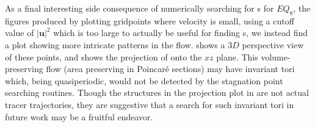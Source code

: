 \documentclass[letter,12pt,openany]{article}
\begin{document}
As a final interesting side consequence of
numerically searching for \stagp s for $EQ_8$, the figures produced by
plotting gridpoints where velocity is small, using a cutoff
value of $|\mathbf{u}|^{2}$ which is too large to actually be useful for
finding \stagp s, we instead find a plot showing more
intricate patterns in the flow.  shows a $3D$
perspective view of these points, and
shows the projection of  onto the $xz$ plane. This volume-preserving flow (area preserving in Poincar\'e sections) may
have invariant tori which, being quasiperiodic,
would not be detected by the stagnation point searching routines. Though the structures in the projection plot in  are not actual tracer trajectories, they are suggestive that a search for such invariant tori in future work may be a fruitful endeavor.  
\end{document}
